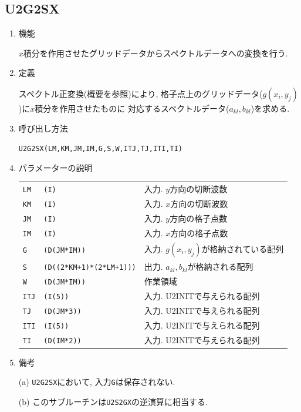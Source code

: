 \documentclass[a4j,fleqn]{jarticle}
\begin{document}

\subsection{U2G2SX}

\begin{enumerate}

\item 機能 

$x$積分を作用させたグリッドデータからスペクトルデータへの変換を行う.

\item 定義

スペクトル正変換(概要を参照)により, 
格子点上のグリッドデータ($g(x_i,y_j)$)に$x$積分を作用させたものに
対応するスペクトルデータ($a_{kl},b_{kl}$)を求める.

\item 呼び出し方法 

{\tt U2G2SX(LM,KM,JM,IM,G,S,W,ITJ,TJ,ITI,TI)}
  
\item パラメーターの説明

\begin{tabular}{lll}
{\tt LM} & {\tt (I)} & 入力. $y$方向の切断波数\\
{\tt KM} & {\tt (I)} & 入力. $x$方向の切断波数\\
{\tt JM} & {\tt (I)} & 入力. $y$方向の格子点数\\
{\tt IM} & {\tt (I)} & 入力. $x$方向の格子点数\\
{\tt G} & {\tt (D(JM*IM))} & 入力. $g(x_i,y_j)$が格納されている配列\\
{\tt S} & {\tt (D((2*KM+1)*(2*LM+1)))} & 出力. $a_{kl},b_{kl}$が格納される配列\\
{\tt W} & {\tt (D(JM*IM))} & 作業領域\\
{\tt ITJ} & {\tt (I(5))} & 入力. U2INITで与えられる配列\\
{\tt TJ} & {\tt (D(JM*3))} & 入力. U2INITで与えられる配列\\
{\tt ITI} & {\tt (I(5))} & 入力. U2INITで与えられる配列\\
{\tt TI} & {\tt (D(IM*2))} & 入力. U2INITで与えられる配列
\end{tabular}

\item 備考

(a) {\tt U2G2SX}において, 入力{\tt G}は保存されない.

(b) このサブルーチンは{\tt U2S2GX}の逆演算に相当する.


\end{enumerate}
\end{document}

